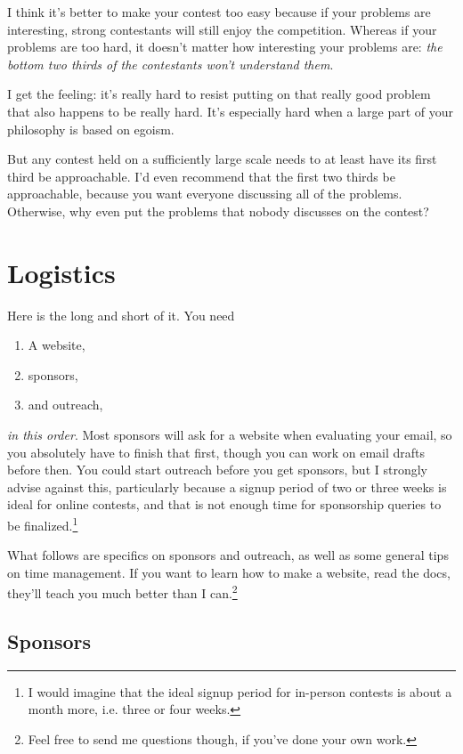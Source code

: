 \documentclass[points=false]{bounce}
\begin{document}
I think it's better to make your contest too easy
because if your problems are interesting,
strong contestants will still enjoy the competition.
Whereas if your problems are too hard,
it doesn't matter how interesting your problems are:
\emph{the bottom two thirds of the contestants
won't understand them}.

I get the feeling:
it's really hard to resist putting on
that really good problem
that also happens to be really hard.
It's especially hard when a large
part of your philosophy
is based on egoism.

But any contest held on a sufficiently large scale
needs to at least have its first third be approachable.
I'd even recommend that the first two thirds be approachable,
because you want everyone discussing all of the problems.
Otherwise, why even put the problems
that nobody discusses on the contest?

\section{Logistics}

Here is the long and short of it. You need
\begin{enumerate}
    \item A website,
    \item sponsors,
    \item and outreach,
\end{enumerate}
\emph{in this order}. Most sponsors will ask for a website when evaluating your email, so you absolutely have to finish that first, though you can work on email drafts before then. You could start outreach before you get sponsors, but I strongly advise against this, particularly because a signup period of two or three weeks is ideal for online contests, and that is not enough time for sponsorship queries to be finalized.\footnote{I would imagine that the ideal signup period for in-person contests is about a month more, i.e. three or four weeks.}

What follows are specifics on sponsors and outreach, as well as some general tips on time management. If you want to learn how to make a website, read the docs, they'll teach you much better than I can.\footnote{Feel free to send me questions though, if you've done your own work.}

\subsection{Sponsors}
\end{document}
